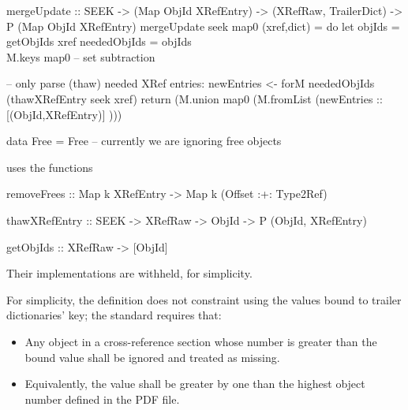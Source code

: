 
\begin{code}
mergeUpdate :: SEEK
            ->  (Map ObjId XRefEntry)
            -> (XRefRaw, TrailerDict)
            -> P (Map ObjId XRefEntry)
mergeUpdate seek map0 (xref,dict) =
    do
    let objIds       = getObjIds xref
        neededObjIds = objIds \\ M.keys map0
                       -- set subtraction

    -- only parse (thaw) needed XRef entries:
    newEntries <- forM neededObjIds
                       (thawXRefEntry seek xref)
    return
      (M.union map0 (M.fromList (newEntries :: [(ObjId,XRefEntry)] )))

data Free = Free  -- currently we are ignoring free objects
\end{code}
 uses the functions
\begin{code}
removeFrees :: Map k XRefEntry -> Map k (Offset :+: Type2Ref)

thawXRefEntry :: SEEK -> XRefRaw -> ObjId -> P (ObjId, XRefEntry)

getObjIds :: XRefRaw -> [ObjId]
\end{code}
%
Their implementations are withheld, for simplicity.

For simplicity, the definition does not constraint \objids{} using the values bound to trailer dictionaries'  key;
%
the standard requires that:
\begin{itemize}
  \item Any object in a cross-reference section whose number is
    greater than the bound value shall be ignored and treated as missing.
  \item Equivalently, the value shall be greater by one than the highest object number defined in the PDF file.
\end{itemize}

